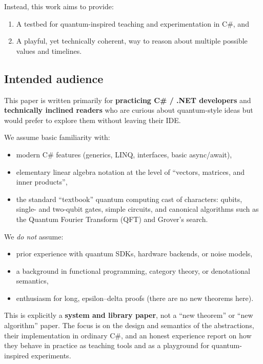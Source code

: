 \documentclass[a4paper,11pt]{article}
\begin{document}
Instead, this work aims to provide:

\begin{enumerate}
\def\labelenumi{\arabic{enumi}.}
\item
  A testbed for quantum-inspired teaching and experimentation in C\#, and
\item
  A playful, yet technically coherent, way to reason about multiple possible values and timelines.
\end{enumerate}

\subsection{Intended audience}

This paper is written primarily for \textbf{practicing C\# / .NET developers} and \textbf{technically inclined readers} who are curious about quantum-style ideas but would prefer to explore them without leaving their IDE.

We assume basic familiarity with:
\begin{itemize}
\item modern C\# features (generics, LINQ, interfaces, basic async/await),
\item elementary linear algebra notation at the level of ``vectors, matrices, and inner products'',
\item the standard ``textbook'' quantum computing cast of characters: qubits, single- and two-qubit gates, simple circuits, and canonical algorithms such as the Quantum Fourier Transform (QFT) and Grover's search.
\end{itemize}

We \emph{do not} assume:
\begin{itemize}
\item prior experience with quantum SDKs, hardware backends, or noise models,
\item a background in functional programming, category theory, or denotational semantics,
\item enthusiasm for long, epsilon--delta proofs (there are no new theorems here).
\end{itemize}

This is explicitly a \textbf{system and library paper}, not a ``new theorem'' or ``new algorithm'' paper. The focus is on the design and semantics of the abstractions, their implementation in ordinary C\#, and an honest experience report on how they behave in practice as teaching tools and as a playground for quantum-inspired experiments.
\end{document}
